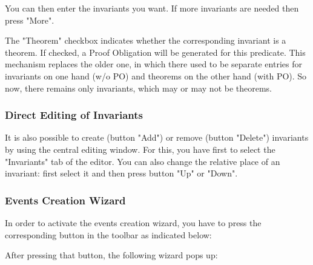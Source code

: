 You can then enter the invariants you want. If more invariants are needed then press "More".

The "Theorem" checkbox indicates whether the corresponding invariant is a theorem. If checked, a Proof Obligation will be generated for this predicate. This mechanism replaces the older one, in which there used to be separate entries for invariants on one hand (w/o PO) and theorems on the other hand (with PO). So now, there remains only invariants, which may or may not be theorems.

\subsubsection{Direct Editing of Invariants}

It is also possible to create (button "Add") or remove (button "Delete") invariants by using the central editing window. For this, you have first to select the "Invariants" tab of the editor. You can also change the relative place of an invariant: first select it and then press button "Up" or "Down". 


\subsubsection{Events Creation Wizard}

In order to activate the events creation wizard, you have to press the corresponding button in the toolbar as indicated below:


After pressing that button, the following wizard pops up: 


